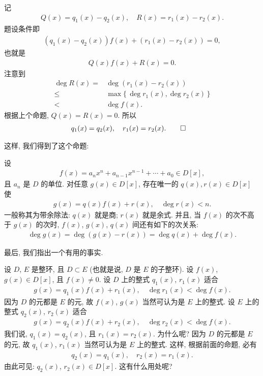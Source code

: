\begin{pf}
    记
    \begin{align*}
        Q(x) = q_1 (x) - q_2 (x), \quad R(x) = r_1 (x) - r_2 (x).
    \end{align*}
    题设条件即
    \begin{align*}
        (q_1 (x) - q_2 (x)) f(x) + (r_1 (x) - r_2 (x)) = 0,
    \end{align*}
    也就是
    \begin{align*}
        Q(x) f(x) + R(x) = 0.
    \end{align*}
    注意到
    \begin{align*}
        \deg R(x)
        =    {} & \deg (r_1 (x) - r_2 (x))                  \\
        \leq {} & \max \{\, \deg r_1 (x), \deg r_2 (x) \,\} \\
        <    {} & \deg f(x).
    \end{align*}
    根据上个命题, $Q(x) = R(x) = 0$. 所以
    \begin{align*}
         & q_1 (x) = q_2 (x), \quad r_1 (x) = r_2 (x). \qedhere
    \end{align*}
\end{pf}

这样, 我们得到了这个命题:

\begin{proposition}
    设
    \begin{align*}
        f(x) = a_n x^n + a_{n-1} x^{n-1} + \cdots + a_0 \in D[x],
    \end{align*}
    且 $a_n$ 是 $D$ 的单位. 对任意 $g(x) \in D[x]$, 存在唯一的 $q(x), r(x) \in D[x]$ 使
    \begin{align*}
        g(x) = q(x) f(x) + r(x), \quad \deg r(x) < n.
    \end{align*}
    一般称其为带余除法: $q(x)$ 就是商; $r(x)$ 就是余式. 并且, 当 $f(x)$ 的次不高于 $g(x)$ 的次时, $f(x)$, $g(x)$, $q(x)$ 间还有如下的次关系:
    \begin{align*}
        \deg g(x) = \deg (g(x) - r(x)) = \deg q(x) + \deg f(x).
    \end{align*}
\end{proposition}

最后, 我们指出一个有用的事实.

设 $D$, $E$ 是整环, 且 $D \subset E$ (也就是说, $D$ 是 $E$ 的子整环). 设 $f(x)$, $g(x) \in D[x]$, 且 $f(x) \neq 0$. 设 $D$ 上的整式 $q_1 (x)$, $r_1 (x)$ 适合
\begin{align*}
    g(x) = q_1 (x) f(x) + r_1 (x), \quad \deg r_1 (x) < \deg f(x).
\end{align*}
因为 $D$ 的元都是 $E$ 的元, 故 $f(x)$, $g(x)$ 当然可认为是 $E$ 上的整式. 设 $E$ 上的整式 $q_2 (x)$, $r_2 (x)$ 适合
\begin{align*}
    g(x) = q_2 (x) f(x) + r_2 (x), \quad \deg r_2 (x) < \deg f(x).
\end{align*}
我们说, $q_1 (x) = q_2 (x)$, 且 $r_1 (x) = r_2 (x)$. 为什么呢? 因为 $D$ 的元都是 $E$ 的元, 故 $q_1 (x)$, $r_1 (x)$ 当然可认为是 $E$ 上的整式. 这样, 根据前面的命题, 必有
\begin{align*}
    q_2 (x) = q_1 (x), \quad r_2 (x) = r_1 (x).
\end{align*}
由此可见: $q_2 (x)$, $r_2 (x) \in D[x]$. 这有什么用处呢?

